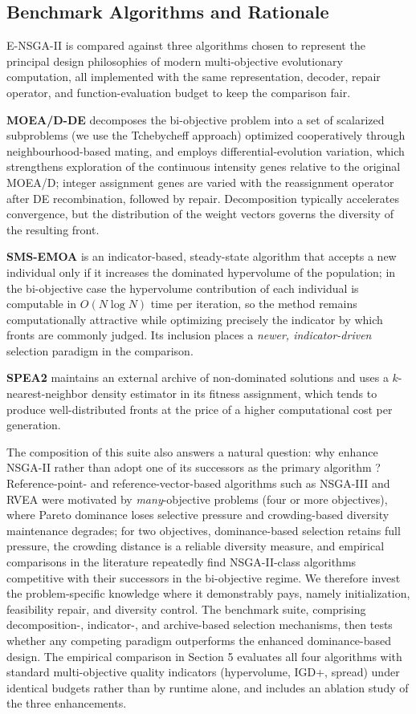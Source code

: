 \documentclass[11pt, a4paper]{article}
\begin{document}
\subsection{Benchmark Algorithms and Rationale}\label{sec:benchmarks}
E-NSGA-II is compared against three algorithms chosen to represent the principal design philosophies of modern multi-objective evolutionary computation, all implemented with the same representation, decoder, repair operator, and function-evaluation budget to keep the comparison fair.

\textbf{MOEA/D-DE}\citep{li2009moeadde} decomposes the bi-objective problem into a set of scalarized subproblems (we use the Tchebycheff approach) optimized cooperatively through neighbourhood-based mating, and employs differential-evolution variation, which strengthens exploration of the continuous intensity genes relative to the original MOEA/D; integer assignment genes are varied with the reassignment operator after DE recombination, followed by repair. Decomposition typically accelerates convergence, but the distribution of the weight vectors governs the diversity of the resulting front.

\textbf{SMS-EMOA}\citep{beume2007smsemoa} is an indicator-based, steady-state algorithm that accepts a new individual only if it increases the dominated hypervolume of the population; in the bi-objective case the hypervolume contribution of each individual is computable in $O(N \log N)$ time per iteration, so the method remains computationally attractive while optimizing precisely the indicator by which fronts are commonly judged. Its inclusion places a \emph{newer, indicator-driven} selection paradigm in the comparison.

\textbf{SPEA2}\citep{zitzler2001spea2} maintains an external archive of non-dominated solutions and uses a $k$-nearest-neighbor density estimator in its fitness assignment, which tends to produce well-distributed fronts at the price of a higher computational cost per generation.

The composition of this suite also answers a natural question: why enhance NSGA-II rather than adopt one of its successors as the primary algorithm ? Reference-point- and reference-vector-based algorithms such as NSGA-III\citep{deb2014nsgaiii} and RVEA\citep{cheng2016rvea} were motivated by \emph{many}-objective problems (four or more objectives), where Pareto dominance loses selective pressure and crowding-based diversity maintenance degrades; for two objectives, dominance-based selection retains full pressure, the crowding distance is a reliable diversity measure, and empirical comparisons in the literature repeatedly find NSGA-II-class algorithms competitive with their successors in the bi-objective regime. We therefore invest the problem-specific knowledge where it demonstrably pays, namely initialization, feasibility repair, and diversity control. The benchmark suite, comprising decomposition-, indicator-, and archive-based selection mechanisms, then tests whether any competing paradigm outperforms the enhanced dominance-based design. The empirical comparison in Section 5 evaluates all four algorithms with standard multi-objective quality indicators (hypervolume, IGD+, spread) under identical budgets rather than by runtime alone, and includes an ablation study of the three enhancements.
\end{document}
